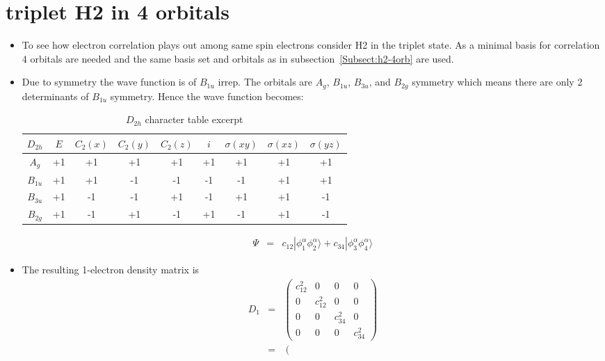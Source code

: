 \documentclass{amsart}
\begin{document}
\section{ triplet H2 in 4 orbitals}

\begin{itemize}
\item To see how electron correlation plays out among same spin electrons consider H2 in 
         the triplet state. As a minimal basis for correlation 4 orbitals are needed and the same
         basis set and orbitals as in subsection~\ref{Subsect:h2-4orb} are used.
\item Due to symmetry the wave function is of $B_{1u}$ irrep. The orbitals are $A_g$, $B_{1u}$, $B_{3u}$, and $B_{2g}$ symmetry
         which means there are only 2 determinants of $B_{1u}$ symmetry. Hence the wave function becomes:
         \begin{table}
         \begin{tabular}{ccccccccc}
         $D_{2h}$ & $E$ & $C_2(x)$ & $C_2(y)$ & $C_2(z)$ & $i$ & $\sigma(xy)$ & $\sigma(xz)$ & $\sigma(yz)$ \\
         \hline
         $A_g$      & +1 & +1 & +1 & +1 & +1 & +1 & +1 & +1 \\
         $B_{1u}$  & +1 & +1 & -1 & -1 & -1 & -1 & +1 & +1 \\
         $B_{3u}$  & +1 & -1 & -1 & +1 & -1 & +1 & +1 & -1 \\
         $B_{2g}$  & +1 & -1 & +1 & -1 & +1 & -1 & +1 & -1
         \end{tabular}
         \caption{$D_{2h}$ character table excerpt}
         \end{table}
         \begin{eqnarray}
         \Psi &=& c_{12}|\phi^\alpha_1\phi^\alpha_2\rangle + c_{34}|\phi^\alpha_3\phi^\alpha_4\rangle 
        \end{eqnarray}
\item The resulting 1-electron density matrix is
         \begin{eqnarray}
         D_{1} &=&
         \left(\begin{matrix}
         c_{12}^2 & 0 & 0 & 0 \\
         0 & c_{12}^2 & 0 & 0 \\
         0 & 0 & c_{34}^2 & 0 \\
         0 & 0 & 0 & c_{34}^2
         \end{matrix}\right) \\
         &=&
         \left(\begin{matrix}

\end{matrix}
\end{eqnarray}
\end{itemize}
\end{document}
